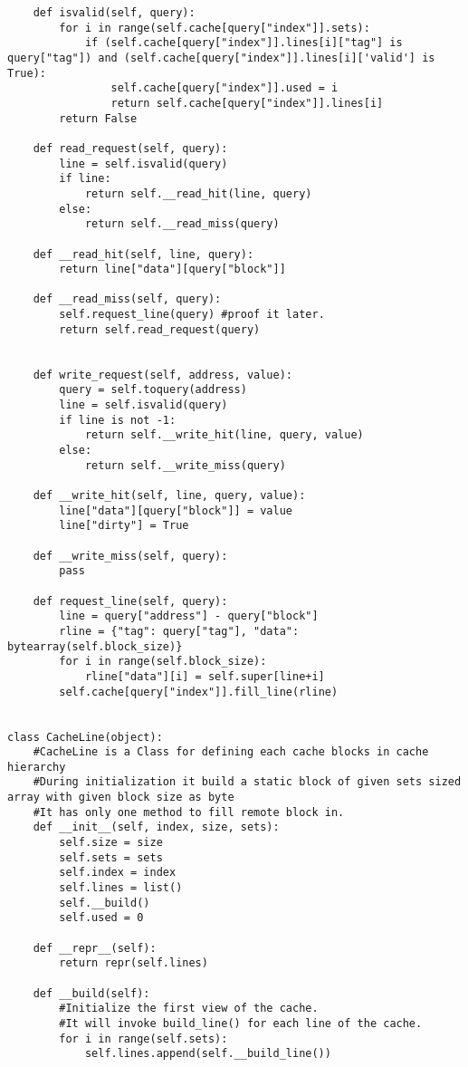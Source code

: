 \begin{verbatim}
    def isvalid(self, query):
        for i in range(self.cache[query["index"]].sets):
            if (self.cache[query["index"]].lines[i]["tag"] is query["tag"]) and (self.cache[query["index"]].lines[i]['valid'] is True):
                self.cache[query["index"]].used = i
                return self.cache[query["index"]].lines[i]
        return False

    def read_request(self, query):
        line = self.isvalid(query)
        if line:
            return self.__read_hit(line, query)
        else:
            return self.__read_miss(query)

    def __read_hit(self, line, query):
        return line["data"][query["block"]]

    def __read_miss(self, query):
        self.request_line(query) #proof it later.
        return self.read_request(query)


    def write_request(self, address, value):
        query = self.toquery(address)
        line = self.isvalid(query)
        if line is not -1:
            return self.__write_hit(line, query, value)
        else:
            return self.__write_miss(query)

    def __write_hit(self, line, query, value):
        line["data"][query["block"]] = value
        line["dirty"] = True

    def __write_miss(self, query):
        pass

    def request_line(self, query):
        line = query["address"] - query["block"]
        rline = {"tag": query["tag"], "data": bytearray(self.block_size)}
        for i in range(self.block_size):
            rline["data"][i] = self.super[line+i]
        self.cache[query["index"]].fill_line(rline)


class CacheLine(object):
    #CacheLine is a Class for defining each cache blocks in cache hierarchy
    #During initialization it build a static block of given sets sized array with given block size as byte
    #It has only one method to fill remote block in.
    def __init__(self, index, size, sets):
        self.size = size
        self.sets = sets
        self.index = index
        self.lines = list()
        self.__build()
        self.used = 0

    def __repr__(self):
        return repr(self.lines)

    def __build(self):
        #Initialize the first view of the cache.
        #It will invoke build_line() for each line of the cache.
        for i in range(self.sets):
            self.lines.append(self.__build_line())


\end{verbatim}
